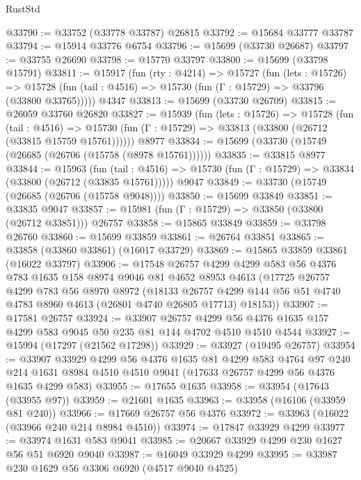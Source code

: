 \begin{lexlean}{RustStd}
\begin{coremodule}
@33790 := @33752 (@33778 @33787) @26815
@33792 := @15684 @33777 @33787
@33794 := @15914 @33776 @6754
@33796 := @15699 (@33730 @26687)
@33797 := @33755 @26690
@33798 := @15770 @33797
@33800 := @15699 (@33798 @15791)
@33811 := @15917
    (fun (rty : @4214) =>
    @15727
      (fun (lets : @15726) =>
      @15728 (fun (tail : @4516) => @15730 (fun (Γ : @15729) => @33796 (@33800 @33765)))))
    @4347
@33813 := @15699 (@33730 @26709)
@33815 := @26059 @33760 @26820
@33827 := @15939
    (fun (lets : @15726) =>
    @15728
      (fun (tail : @4516) =>
      @15730 (fun (Γ : @15729) => @33813 (@33800 (@26712 (@33815 @15759 @15761))))))
    @8977
@33834 := @15699 (@33730 (@15749 (@26685 (@26706 (@15758 (@8978 @15761))))))
@33835 := @33815 @8977
@33844 := @15963
    (fun (tail : @4516) => @15730 (fun (Γ : @15729) => @33834 (@33800 (@26712 (@33835 @15761)))))
    @9047
@33849 := @33730 (@15749 (@26685 (@26706 (@15758 @9048))))
@33850 := @15699 @33849
@33851 := @33835 @9047
@33857 := @15981 (fun (Γ : @15729) => @33850 (@33800 (@26712 @33851))) @26757
@33858 := @15865 @33849
@33859 := @33798 @26760
@33860 := @15699 @33859
@33861 := @26764 @33851
@33865 := @33858 (@33860 @33861) (@16017 @33729)
@33869 := @15865 @33859 @33861 (@16022 @33797)
@33906 := @17548
    @26757
    @4299
    @4299
    @583
    @56
    @4376
    @783
    @1635
    @158
    @8974
    @9046
    @81
    @4652
    @8953
    @4613
    (@17725
      @26757
      @4299
      @783
      @56
      @8970
      @8972
      (@18133
        @26757
        @4299
        @144
        @56
        @51
        @4740
        @4783
        @8960
        @4613
        (@26801 @4740 @26805 @17713)
        @18153))
@33907 := @17581 @26757
@33924 := @33907
    @26757
    @4299
    @56
    @4376
    @1635
    @157
    @4299
    @583
    @9045
    @50
    @235
    @81
    @144
    @4702
    @4510
    @4510
    @4544
@33927 := @15994 (@17297 (@21562 @17298))
@33929 := @33927 (@19495 @26757)
@33954 := @33907
    @33929
    @4299
    @56
    @4376
    @1635
    @81
    @4299
    @583
    @4764
    @97
    @240
    @214
    @1631
    @8984
    @4510
    @4510
    @9041
    (@17633 @26757 @4299 @56 @4376 @1635 @4299 @583)
@33955 := @17655 @1635
@33958 := @33954 (@17643 (@33955 @97))
@33959 := @21601 @1635
@33963 := @33958 (@16106 (@33959 @81 @240))
@33966 := @17669 @26757 @56 @4376
@33972 := @33963 (@16022 (@33966 @240 @214 @8984 @4510))
@33974 := @17847 @33929 @4299
@33977 := @33974 @1631 @583 @9041
@33985 := @20667 @33929 @4299 @230 @1627 @56 @51 @6920 @9040
@33987 := @16049 @33929 @4299
@33995 := @33987 @230 @1629 @56 @3306 @6920 (@4517 @9040 @4525)

\end{coremodule}
\end{lexlean}

